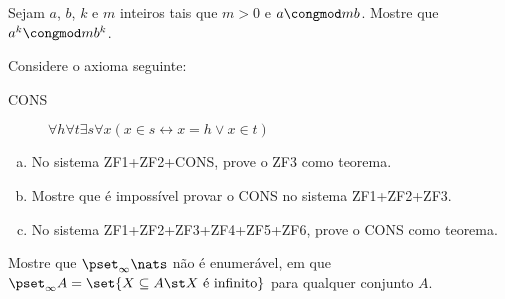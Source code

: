 \begin{exercise}
    Sejam $a$, $b$, $k$ e $m$ inteiros tais que $m>0$ e $a \congmod m b$. 
    Mostre que $a^k \congmod m {b^k}$.
\end{exercise}

\begin{exercise}
Considere o axioma seguinte:

\begin{description}
	\item[CONS] $\forall h \forall t \exists s \forall x (x \in s \leftrightarrow x=h \lor x \in t)$
\end{description}

\begin{enumerate}[a)]
\item No sistema ZF1+ZF2+CONS, prove o ZF3 como teorema.
\item Mostre que é impossível provar o CONS no sistema ZF1+ZF2+ZF3. 
\item No sistema ZF1+ZF2+ZF3+ZF4+ZF5+ZF6, prove o CONS como teorema.
\end{enumerate}
\end{exercise}

\begin{exercise}
Mostre que $\pset_{\infty}\nats$ não é enumerável, em que $\pset_{\infty}A = \set{X \subseteq A \st X \text{ é infinito}}$ 
para qualquer conjunto $A$. 
\end{exercise}